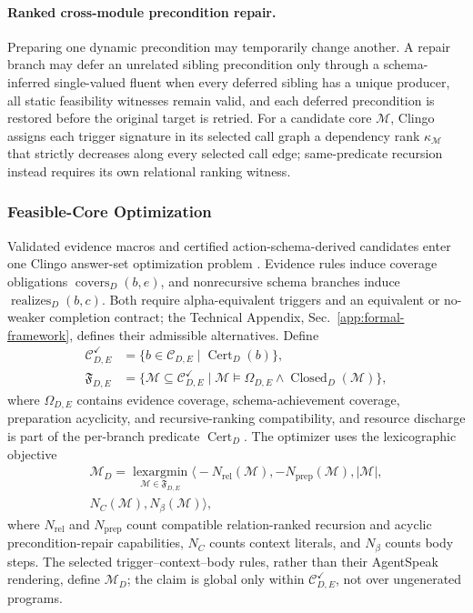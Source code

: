 \paragraph{Ranked cross-module precondition repair.}
Preparing one dynamic precondition may temporarily change another. A repair
branch may defer an unrelated sibling precondition
only through a schema-inferred single-valued fluent when every deferred sibling
has a unique producer, all static feasibility witnesses remain valid, and each deferred
precondition is restored before the original target is retried. For a candidate core
$\mathcal M$, Clingo assigns each trigger signature in its selected call graph
a dependency rank $\kappa_{\mathcal M}$ that strictly decreases along every
selected call edge; same-predicate recursion instead requires its own relational
ranking witness.

\subsubsection{Feasible-Core Optimization}

Validated evidence macros and certified action-schema-derived candidates enter
one Clingo answer-set optimization problem
\cite{Gebser2018Clingo}. Evidence rules induce coverage obligations
$\operatorname{covers}_D(b,e)$, and nonrecursive schema branches induce
$\operatorname{realizes}_D(b,c)$. Both require alpha-equivalent triggers and an
equivalent or no-weaker completion contract; the Technical Appendix,
Sec.~\ref{app:formal-framework},
defines their admissible alternatives.
Define
\begin{align*}
\mathcal C^{\checkmark}_{D,E}
  &=\{b\in\mathcal C_{D,E}\mid\operatorname{Cert}_D(b)\},\\
\mathfrak F_{D,E}
  &=\{\mathcal M\subseteq\mathcal C^{\checkmark}_{D,E}\mid
      \mathcal M\models\Omega_{D,E}\land
      \operatorname{Closed}_D(\mathcal M)\},
\end{align*}
where $\Omega_{D,E}$ contains evidence coverage, schema-achievement coverage,
preparation acyclicity, and recursive-ranking compatibility, and resource
discharge is part of the per-branch predicate $\operatorname{Cert}_D$.
The optimizer uses the
lexicographic objective
\begin{multline*}
\mathcal M_D=\operatorname*{lexargmin}_{\mathcal M\in\mathfrak F_{D,E}}
\bigl\langle-N_{\mathrm{rel}}(\mathcal M),-N_{\mathrm{prep}}(\mathcal M),
|\mathcal M|,\\
N_C(\mathcal M),N_\beta(\mathcal M)\bigr\rangle,
\end{multline*}
where $N_{\mathrm{rel}}$ and $N_{\mathrm{prep}}$ count compatible
relation-ranked recursion and acyclic precondition-repair capabilities,
$N_C$ counts context literals, and $N_\beta$ counts body steps. The selected
trigger--context--body rules, rather than their AgentSpeak rendering, define
$\mathcal M_D$; the claim is global only within
$\mathcal C^{\checkmark}_{D,E}$, not over ungenerated programs.

